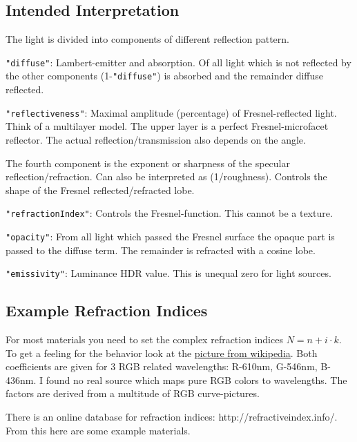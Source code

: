 \documentclass[english,10pt,a4paper,twocolumn,colorscheme=green]{orarticle}
\begin{document}
	\subsection{Intended Interpretation}
	The light is divided into components of different reflection pattern.
	
	\lstinline|"diffuse"|: Lambert-emitter and absorption. Of all light which is not reflected by the other components (1-\lstinline|"diffuse"|) is absorbed and the remainder diffuse reflected.
	
	\lstinline|"reflectiveness"|: Maximal amplitude (percentage) of Fresnel-reflected light. Think of a multilayer model. The upper layer is a perfect Fresnel-microfacet reflector. The actual reflection/transmission also depends on the angle.
	
	The fourth component is the exponent or sharpness of the specular reflection/refraction. Can also be interpreted as (1/roughness). Controls the shape of the Fresnel reflected/refracted lobe.
	
	\lstinline|"refractionIndex"|: Controls the Fresnel-function. This cannot be a texture.
	
	\lstinline|"opacity"|: From all light which passed the Fresnel surface the opaque part is passed to the diffuse term. The remainder is refracted with a cosine lobe. %
	
	\lstinline|"emissivity"|: Luminance HDR value. This is unequal zero for light sources.
	
	\subsection{Example Refraction Indices}
	For most materials you need to set the complex refraction indices $N = n + i \cdot k$. To get a feeling for the behavior look at the \href{	http://de.wikipedia.org/wiki/Fresnelsche\_Formeln\#mediaviewer/File:Fresnel\_reflection\_coefficients\_\%28DE\%29.svg}{picture from wikipedia}. Both coefficients are given for 3 RGB related wavelengths: R-610nm, G-546nm, B-436nm. I found no real source which maps pure RGB colors to wavelengths. The factors are derived from a multitude of RGB curve-pictures.
	
	There is an online database for refraction indices: http://refractiveindex.info/.
	From this here are some example materials.
	
\end{document}

